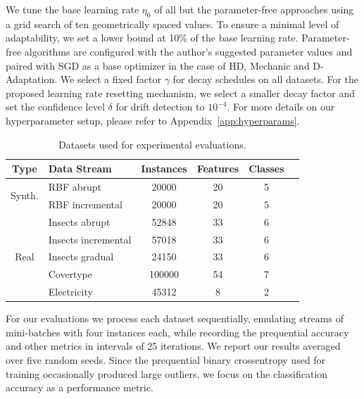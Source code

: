 \documentclass[runningheads]{llncs}
\begin{document}
We tune the base learning rate $\eta_0$ of all but the parameter-free approaches using a grid search of ten geometrically spaced values.
To ensure a minimal level of adaptability, we set a lower bound at 10\% of the base learning rate.
Parameter-free algorithms are configured with the author's suggested parameter values and paired with SGD as a base optimizer in the case of HD, Mechanic and D-Adaptation.
We select a fixed factor $\gamma$ for decay schedules on all datasets.
For the proposed learning rate resetting mechanism, we select a smaller decay factor and set the confidence level $\delta$ for drift detection to $10^{-4}$.
For more details on our hyperparameter setup, please refer to Appendix~\ref{app:hyperparams}.
\begin{table}[t]
	\centering
	\small
	\begin{tabular}{@{}clcccc@{}}
		\toprule
		Type                    & Data Stream               & Instances & Features & Classes \\
		\midrule
		\multirow{2}{*}{Synth.} & RBF abrupt                & 20000     & 20       & 5       \\
		                        & RBF incremental           & 20000     & 20       & 5       \\
		\midrule
		\multirow{5}{*}{Real}   & Insects abrupt            & 52848     & 33       & 6       \\
		                        & Insects incremental       & 57018     & 33       & 6       \\
		                        & Insects gradual           & 24150     & 33       & 6       \\
		                        & Covertype\footnotemark[3] & 100000    & 54       & 7       \\
		                        & Electricity               & 45312     & 8        & 2       \\
		\bottomrule
	\end{tabular}
	\caption{Datasets used for experimental evaluations.}
	\label{tab:datasets}
\end{table}
For our evaluations we process each dataset sequentially, emulating streams of mini-batches with four instances each, while recording the prequential accuracy and other metrics in intervals of 25 iterations.
We report our results averaged over five random seeds.
Since the prequential binary crossentropy used for training occasionally produced large outliers, we focus on the classification accuracy as a performance metric.
\end{document}
